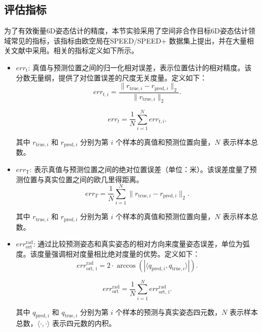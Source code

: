 \subsection{评估指标}
为了有效衡量6D姿态估计的精度，本节实验采用了空间非合作目标6D姿态估计领域常见的指标，该指标由欧空局在SPEED/SPEED+ 数据集上提出，并在大量相关文献中采用。相关的指标定义如下所示。
\begin{itemize}
	\item $err_{\text{t}}$: 真值与预测位置之间的归一化相对误差，表示位置估计的相对精度。该分数无量纲，提供了对位置误差的尺度无关度量。定义如下：
	\begin{equation}
		err_{t,i} = \frac{\| r_{\text{true},i} - r_{\text{pred},i} \|_2}{\| r_{\text{true},i} \|_2}.
	\end{equation}
	
	\begin{equation}
		err_t = \frac{1}{N} \sum\limits_{i=1}^{N} err_{t,i}.
	\end{equation}
	
	其中 $r_{\text{true},i}$ 和 $r_{\text{pred},i}$ 分别为第 $i$ 个样本的真值和预测位置向量，$N$ 表示样本总数。
	
	\item $err_{\text{T}}$: 表示真值与预测位置之间的绝对位置误差（单位：米）。该误差度量了预测位置与真实位置之间的欧几里得距离。
	\begin{equation}
		err_T = \frac{1}{N}\sum\limits_{i=1}^{N} \| r_{\text{true},i} - r_{\text{pred},i} \|_2.
	\end{equation}
	
	其中 $r_{\text{true},i}$ 和 $r_{\text{pred},i}$ 分别为第 $i$ 个样本的真值和预测位置向量，$N$ 表示样本总数。
	
	\item $err_{\text{ort}}^{\text{rad}}$: 通过比较预测姿态和真实姿态的相对方向来度量姿态误差，单位为弧度。该度量强调相对度量相比绝对度量的优势。定义如下：
	\begin{equation}
		err_{\text{ort, i}}^{\text{rad}} =  2 \cdot \arccos \left( \left| \langle q_{\text{pred},i}, q_{\text{true},i} \rangle \right| \right).
	\end{equation}
	
	\begin{equation}
		err_{\text{ort}}^{\text{rad}} = \frac{1}{N}\sum\limits_{i=1}^N err_{\text{ort, i}}^{\text{rad}}.
	\end{equation}
	
	其中 $q_{\text{pred},i}$ 和 $q_{\text{true},i}$ 分别为第 $i$ 个样本的预测与真实姿态四元数，$N$ 表示样本总数，$\langle \cdot, \cdot \rangle$ 表示四元数的内积。
	

\end{itemize}
